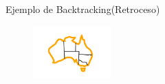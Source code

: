     \begin{frame}{Ejemplo de Backtracking(Retroceso) }
        \begin{figure}\includegraphics[width =30mm]{14img.png}\end{figure}
    \end{frame}